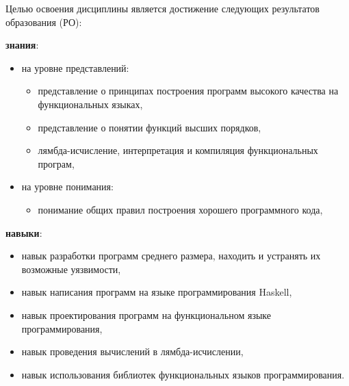 Целью освоения дисциплины является достижение следующих результатов образования (РО):\\
{\parindent0pt

\textbf{знания}:
\begin{itemize}
\item на уровне представлений:
\begin{itemize}
\item представление о принципах построения программ высокого качества на функциональных языках,\item представление о понятии функций высших порядков,\item лямбда-исчисление, интерпретация и компиляция функциональных програм,
\end{itemize}


\item на уровне понимания:
\begin{itemize}
\item понимание общих правил построения хорошего программного кода,
\end{itemize}
\end{itemize}

\textbf{навыки}:
\begin{itemize}
\item навык разработки программ среднего размера, находить и устранять их возможные уязвимости,\item навык написания программ на языке программирования Haskell,\item навык проектирования программ на функциональном языке программирования,\item навык проведения вычислений в лямбда-исчислении,\item навык использования библиотек функциональных языков программирования.
\end{itemize}

}
